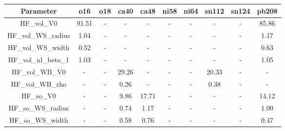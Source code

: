 \begin{tabular}{|c||c||c||c||c||c||c||c||c||c|} 
 \hline 
\bf{Parameter}& \bf{o16}& \bf{o18}& \bf{ca40}& \bf{ca48}& \bf{ni58}& \bf{ni64}& \bf{sn112}& \bf{sn124}& \bf{pb208}\\
 \hline
 \hline 
HF\_vol\_V0 & 91.51 & - & - & - & - & - & - & - & 85.86\\
HF\_vol\_WS\_radius & 1.04 & - & - & - & - & - & - & - & 1.17\\
HF\_vol\_WS\_width & 0.52 & - & - & - & - & - & - & - & 0.63\\
HF\_vol\_nl\_beta\_1 & 1.03 & - & - & - & - & - & - & - & 1.05\\
HF\_vol\_WB\_V0 & - & - & 29.26 & - & - & - & 20.33 & - & -\\
HF\_vol\_WB\_rho & - & - & 0.26 & - & - & - & 0.38 & - & -\\
HF\_so\_V0 & - & - & 9.86 & 17.71 & - & - & - & - & 14.12\\
HF\_so\_WS\_radius & - & - & 0.74 & 1.17 & - & - & - & - & 1.00\\
HF\_so\_WS\_width & - & - & 0.58 & 0.76 & - & - & - & - & 0.47\\

 \hline 
\end{tabular}